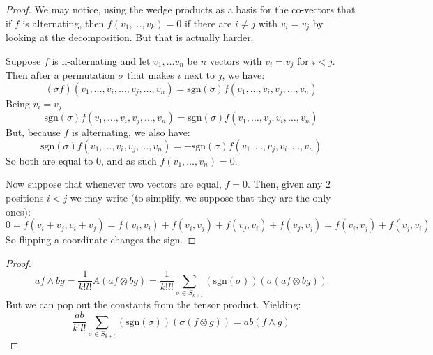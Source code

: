 \begin{problem}
\end{problem}
\begin{proof}
	We may notice, using the wedge products as a basis for the co-vectors that if $f$ is alternating, then $f(v_1, \dots, v_k) = 0$ if
	there are $i \neq j$ with $v_i = v_j$ by looking at the decomposition. But that is actually harder.

	Suppose $f$ is n-alternating and let $v_1, \dots v_n$ be $n$ vectors with $v_i = v_j$ for $i < j$. Then
	after a permutation $\sigma$ that makes $i$ next to $j$, we have:
	$$(\sigma f)(v_1,\dots,v_i,\dots,v_j,\dots,v_n) = \text{sgn}(\sigma) f(v_1, \dots, v_i,v_j, \dots, v_n)$$
	Being $v_i = v_j$
	$$\text{sgn}(\sigma) f(v_1, \dots, v_i,v_j, \dots, v_n) = \text{sgn}(\sigma) f(v_1, \dots, v_j,v_i, \dots, v_n)$$
	But, because $f$ is alternating, we also have:
	$$\text{sgn}(\sigma) f(v_1, \dots, v_i,v_j, \dots, v_n) = - \text{sgn}(\sigma) f(v_1, \dots, v_j,v_i, \dots, v_n)$$
	So both are equal to $0$, and as such
	$f(v_1, \dots, v_n) = 0$.

	Now suppose that whenever two vectors are equal, $f = 0$. Then, given any 2 positions $i < j$ we may write (to simplify, we suppose that
	they are the only ones):
	\begin{equation*}
		0 = f(v_i + v_j, v_i + v_j)  = f(v_i, v_i) + f(v_i, v_j) + f(v_j, v_i) + f(v_j, v_j) = f(v_i,v_j) + f(v_j,v_i)
	\end{equation*}
	So flipping a coordinate changes the sign.
\end{proof}

\begin{problem}
\end{problem}
\begin{proof}
	$$af \wedge bg = \frac{1}{k!l!}A(af \otimes bg) = \frac{1}{k!l!} \sum_{\sigma \in S_{k+l}} (\text{sgn}(\sigma))(\sigma (af\otimes bg))$$
	But we can pop out the constants from the tensor product. Yielding:
	$$\frac{ab}{k!l!} \sum_{\sigma \in S_{k+l}} (\text{sgn}(\sigma))(\sigma (f\otimes g)) = ab(f\wedge g)$$
\end{proof}

